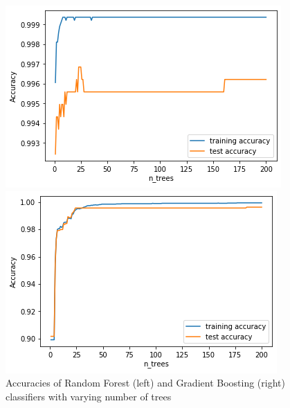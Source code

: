 \begin{itemize}
    \begin{figure}[ht]
    \centering
        \begin{minipage}[b]{0.45\textwidth}
        \includegraphics[width=\textwidth]{Figures/randomforest_trees.png}
    \end{minipage}
    \quad
    \begin{minipage}[b]{0.45\textwidth}
        \includegraphics[width=\textwidth]{Figures/gradientboosted_trees.png}
    \end{minipage}
    \captionsetup{justification=centering}
    \caption{Accuracies of Random Forest (left) and Gradient Boosting (right) classifiers with varying number of trees}
    \label{fig:ensemble_n_trees}
    \end{figure}
    

\end{itemize}
